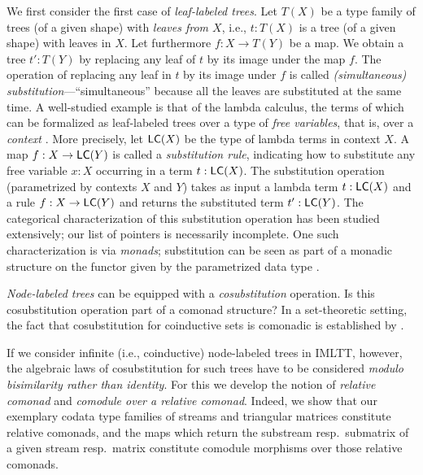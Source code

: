 \documentclass[a4paper,USenglish]{lipics}
\begin{document}
We first consider the first case of \emph{leaf-labeled trees}.
 Let $T(X)$ be a type family of trees (of a given shape) with \emph{leaves from $X$}, i.e., $t: T(X)$ is a tree (of a given shape) with leaves in $X$.
 Let furthermore $f : X \to T(Y)$ be a map. We obtain a tree $t' : T(Y)$ by replacing any leaf of $t$ by its image under the map $f$.
 The operation of replacing any leaf in $t$ by its image under $f$ is called \emph{(simultaneous) substitution}---\enquote{simultaneous} because all the leaves are 
 substituted at the same time. 
 A well-studied example is that of the lambda calculus, the terms of which can be formalized as leaf-labeled trees over a type of \emph{free variables}, that is,
 over a \emph{context} \parencite{alt_reus}.
 More precisely, let $\mathsf{LC}(X)$ be the type of lambda terms in context $X$. A map $f : X \to \mathsf{LC}(Y)$ is called a \emph{substitution rule}, indicating how to substitute any 
 free variable $x:X$ occurring in a term $t : \mathsf{LC}(X)$. 
 The substitution operation (parametrized by contexts $X$ and $Y$) takes as input a lambda term $t : \mathsf{LC}(X)$ and a rule $f : X \to \mathsf{LC}(Y)$ and returns the substituted term
 $t' : \mathsf{LC}(Y)$.
 The categorical characterization of this substitution operation
 has been studied extensively; our list of pointers \parencite{alt_reus, fpt, Power:2007:ASS:1230146.1230276, Tanaka:2005:UCF:1088454.1088457,
 DBLP:journals/iandc/HirschowitzM10, DBLP:conf/fossacs/AltenkirchCU10, ahrens_relmonads} is necessarily incomplete.
 One such characterization is via \emph{monads}; substitution can be seen as part of a monadic structure on the functor 
 given by the parametrized data type \parencite{alt_reus, 
 DBLP:journals/iandc/HirschowitzM10, DBLP:conf/fossacs/AltenkirchCU10, ahrens_relmonads}.
 
 
 \emph{Node-labeled trees} can be equipped with a \emph{cosubstitution} operation. 
 Is this cosubstitution operation part of a comonad structure?
 In a set-theoretic setting, the fact that cosubstitution for coinductive sets is comonadic is established by \textcite{DBLP:conf/sfp/UustaluV01}.
 
  
 If we consider infinite (i.e., coinductive) node-labeled trees in IMLTT, however, the algebraic laws of cosubstitution for such trees have to be considered 
 \emph{modulo bisimilarity rather than identity}.
 For this we develop the notion of \emph{relative comonad} and \emph{comodule over a relative comonad}.
 Indeed, we show that our exemplary codata type families of streams and triangular matrices constitute relative comonads, and the maps which 
 return the substream resp.\ submatrix of a given stream resp.\ matrix constitute comodule morphisms over those relative comonads.
 
\end{document}

